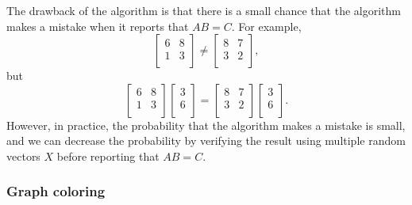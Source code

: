 The drawback of the algorithm is
that there is a small chance that the algorithm
makes a mistake when it reports that $AB=C$.
For example,
\[
    \begin{bmatrix}
        6 & 8 \\
        1 & 3 \\
    \end{bmatrix}
    \neq
    \begin{bmatrix}
        8 & 7 \\
        3 & 2 \\
    \end{bmatrix},
\]
but
\[
    \begin{bmatrix}
        6 & 8 \\
        1 & 3 \\
    \end{bmatrix}
    \begin{bmatrix}
        3 \\
        6 \\
    \end{bmatrix}
    =
    \begin{bmatrix}
        8 & 7 \\
        3 & 2 \\
    \end{bmatrix}
    \begin{bmatrix}
        3 \\
        6 \\
    \end{bmatrix}.
\]
However, in practice, the probability that the
algorithm makes a mistake is small,
and we can decrease the probability by
verifying the result using multiple random vectors $X$
before reporting that $AB=C$.

\subsubsection{Graph coloring}


